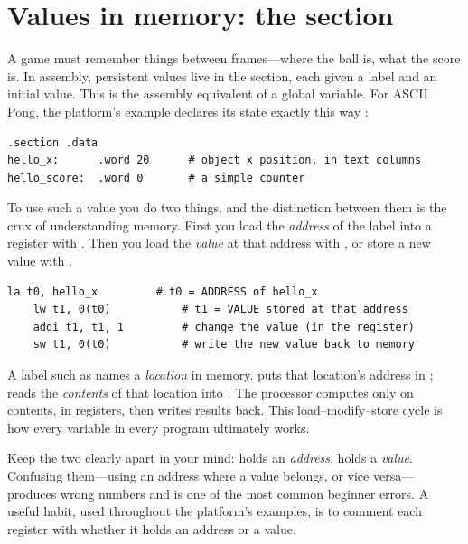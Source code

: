 \section{Values in memory: the  section}

A game must remember things between frames---where the ball is, what the score
is. In assembly, persistent values live in the  section, each given a
label and an initial value. This is the assembly equivalent of a global variable.
For ASCII Pong, the platform's example declares its state exactly this way
\citep{prg32repo}:

\begin{lstlisting}[style=asm,caption={Game state in \code{.data}. Each label names a memory location holding one 32-bit word.}]
.section .data
hello_x:      .word 20      # object x position, in text columns
hello_score:  .word 0       # a simple counter
\end{lstlisting}

To use such a value you do two things, and the distinction between them is the
crux of understanding memory. First you load the \emph{address} of the label into
a register with . Then you load the \emph{value} at that address with
, or store a new value with .

\begin{lstlisting}[style=asm,caption={The load--modify--store cycle: read a value from memory, change it in a register, write it back.}]
    la t0, hello_x         # t0 = ADDRESS of hello_x
    lw t1, 0(t0)           # t1 = VALUE stored at that address
    addi t1, t1, 1         # change the value (in the register)
    sw t1, 0(t0)           # write the new value back to memory
\end{lstlisting}

\begin{prgconcept}
A label such as  names a \emph{location} in memory.  puts that location's address in ;  reads the
\emph{contents} of that location into . The processor computes only on
contents, in registers, then writes results back. This load--modify--store cycle
is how every variable in every program ultimately works.
\end{prgconcept}

\begin{prgwarn}
Keep the two clearly apart in your mind:  holds an \emph{address}, 
holds a \emph{value}. Confusing them---using an address where a value belongs, or
vice versa---produces wrong numbers and is one of the most common beginner errors.
A useful habit, used throughout the platform's examples, is to comment each
register with whether it holds an address or a value.
\end{prgwarn}

